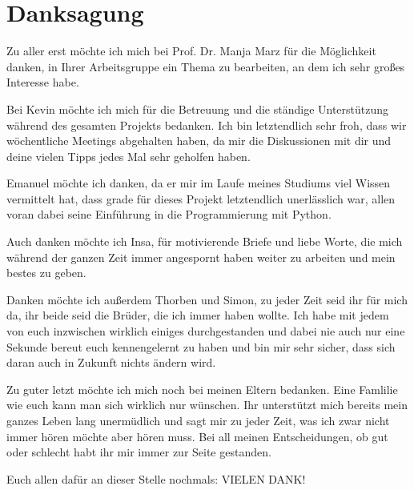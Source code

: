 \chapter*{Danksagung}


Zu aller erst möchte ich mich bei Prof. Dr. Manja Marz für die Möglichkeit danken, in Ihrer Arbeitsgruppe ein Thema zu bearbeiten, an dem ich sehr großes Interesse habe.

\vspace{1em}

Bei Kevin möchte ich mich für die Betreuung und die ständige Unterstützung während des gesamten Projekts bedanken. Ich bin letztendlich sehr froh, dass wir wöchentliche Meetings abgehalten haben, da mir die Diskussionen mit dir und deine vielen Tipps jedes Mal sehr geholfen haben. 

\vspace{1em}

Emanuel möchte ich danken, da er mir im Laufe meines Studiums viel Wissen vermittelt hat, dass grade für dieses Projekt letztendlich unerlässlich war, allen voran dabei seine Einführung in die Programmierung mit Python.



\vspace{1em}

Auch danken möchte ich Insa, für motivierende Briefe und liebe Worte, die mich während der ganzen Zeit immer angespornt haben weiter zu arbeiten und mein bestes zu geben.

\vspace{1em}

Danken möchte ich außerdem Thorben und Simon, zu jeder Zeit seid ihr für mich da, ihr beide seid die Brüder, die ich immer haben wollte. Ich habe mit jedem von euch inzwischen wirklich einiges durchgestanden und dabei nie auch nur eine Sekunde bereut euch kennengelernt zu haben und bin mir sehr sicher, dass sich daran auch in Zukunft nichts ändern wird.

\vspace{1em}

Zu guter letzt möchte ich mich noch bei meinen Eltern bedanken. Eine Famlilie wie euch kann man sich wirklich nur wünschen. Ihr unterstützt mich bereits mein ganzes Leben lang unermüdlich und sagt mir zu jeder Zeit, was ich zwar nicht immer hören möchte aber hören muss. Bei all meinen Entscheidungen, ob gut oder schlecht habt ihr mir immer zur Seite gestanden. 

\vspace{1em}

Euch allen dafür an dieser Stelle nochmals: VIELEN DANK!